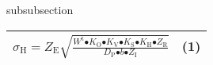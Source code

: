 subsubsection{}\begin{tabular}{|p{3.1in}|p{1.2in}|} \hline 
${\sigma }_{\mathrm{H}}\mathrm{=}Z_{\mathrm{E}}\sqrt{\frac{W^{\mathrm{t}}{\mathrm{\bullet }K}_{\mathrm{O}}{\mathrm{\bullet }K}_{\mathrm{V}}\mathrm{\bullet }K_{\mathrm{S}}\mathrm{\bullet }K_{\mathrm{H}}\mathrm{\bullet }Z_{\mathrm{R}}}{D_{\mathrm{P}}\mathrm{\bullet }b\mathrm{\bullet }Z_{\mathrm{I}}}}$ & (1) \\ \hline 
\end{tabular}